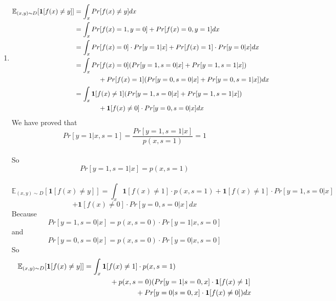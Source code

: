 \documentclass[12pt]{article}
\begin{document}
\begin{enumerate}
	
	\item
	\begin{align*}
	\mathbb{E}_{(x,y)\sim D}[\textbf{1}[f(x)\neq y]] &= \int _x Pr[f(x)\neq y]dx\\ 
	&= \int_x Pr[f(x)=1,y=0]+Pr[f(x)=0,y=1]dx\\ 
	&= \int_x Pr[f(x)=0]\cdot Pr[y=1|x]+Pr[f(x)=1]\cdot Pr[y=0|x]dx\\ 
	&= \int_x Pr[f(x)=0] (Pr[y=1,s=0|x]+Pr[y=1,s=1|x])\\
    &\hspace*{0.5in}+Pr[f(x)=1](Pr[y=0,s=0|x]+Pr[y=0,s=1|x])dx\\ 
	&= \int_x \mathbf{1}[f(x)\neq 1] (Pr[y=1,s=0|x]+Pr[y=1,s=1|x])\\
	&\hspace*{0.5in}+\mathbf{1}[f(x)\neq 0]\cdot Pr[y=0,s=0|x]dx
	\end{align*}
	We have proved that $$Pr[y=1|x,s=1]=\frac{Pr[y=1,s=1|x]}{p(x,s=1)}=1$$\\
	So $$Pr[y=1,s=1|x]=p(x,s=1)$$\\
	$$\mathbb{E}_{(x,y)\sim D}[\textbf{1}[f(x)\neq y]] = \int_x \mathbf{1}[f(x)\neq 1]\cdot p(x,s=1)+\mathbf{1}[f(x)\neq 1] \cdot Pr[y=1,s=0|x]$$
	$$+\mathbf{1}[f(x)\neq 0]\cdot Pr[y=0,s=0|x]dx$$
	Because $$Pr[y=1,s=0|x]=p(x,s=0)\cdot Pr[y=1|x,s=0]$$
	and $$Pr[y=0,s=0|x]=p(x,s=0)\cdot Pr[y=0|x,s=0]$$
	So\\
	\begin{align*}
	\mathbb{E}_{(x,y)\sim D}[\textbf{1}[f(x)\neq y]] &= \int_x \mathbf{1}[f(x)\neq 1]\cdot p(x,s=1)\\
	&\hspace*{0.5in}+p(x,s=0)(Pr[y = 1 | s = 0, x]\cdot \mathbf{1}[f (x)\neq 1]\\
	&\hspace*{1in}+Pr[y = 0 | s = 0, x]\cdot \mathbf{1}[f (x)\neq 0])dx
	\end{align*}
	

\end{enumerate}
\end{document}
